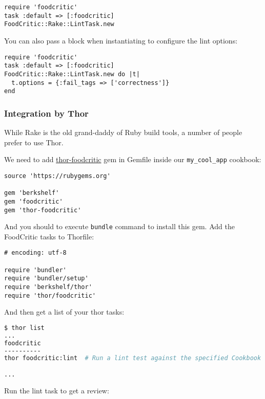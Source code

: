 \begin{lstlisting}[label=lst:testing-rake1]
require 'foodcritic'
task :default => [:foodcritic]
FoodCritic::Rake::LintTask.new
\end{lstlisting}

You can also pass a block when instantiating to configure the lint options:

\begin{lstlisting}[label=lst:testing-rake2]
require 'foodcritic'
task :default => [:foodcritic]
FoodCritic::Rake::LintTask.new do |t|
  t.options = {:fail_tags => ['correctness']}
end
\end{lstlisting}

\subsubsection{Integration by Thor}

While Rake is the old grand-daddy of Ruby build tools, a number of people prefer to use Thor.

We need to add \href{https://github.com/reset/thor-foodcritic}{thor-foodcritic} gem in Gemfile inside our \lstinline!my_cool_app! cookbook:

\begin{lstlisting}[label=lst:testing-thor1]
source 'https://rubygems.org'

gem 'berkshelf'
gem 'foodcritic'
gem 'thor-foodcritic'
\end{lstlisting}

And you should to execute \lstinline!bundle! command to install this gem. Add the FoodCritic tasks to Thorfile:

\begin{lstlisting}[label=lst:testing-thor2]
# encoding: utf-8

require 'bundler'
require 'bundler/setup'
require 'berkshelf/thor'
require 'thor/foodcritic'
\end{lstlisting}

And then get a list of your thor tasks:

\begin{lstlisting}[language=Bash,label=lst:testing-thor3]
$ thor list
...
foodcritic
----------
thor foodcritic:lint  # Run a lint test against the specified Cookbook and Role paths or otherwise your current working directory.

...
\end{lstlisting}

Run the lint task to get a review:

